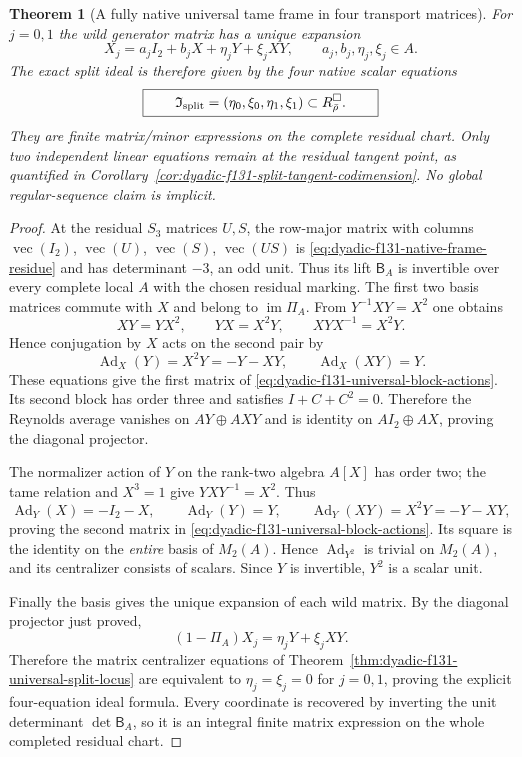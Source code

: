 \documentclass[11pt]{article}
\newtheorem{theorem}{Theorem}[section]
\theoremstyle{definition}
\begin{document}
\begin{theorem}[A fully native universal tame frame in four transport matrices]
For $j=0,1$ the wild
generator matrix has
a unique expansion
\begin{equation}\label{eq:dyadic-f131-wild-native-components}
\boxed{
X_j=a_j I_2+b_j X
+\eta_jY+\xi_jXY,
\qquad
a_j,b_j,\eta_j,\xi_j\in A.
}
\end{equation}
The \emph{exact} split
ideal is therefore
given by the four
native scalar
equations
\begin{equation}\label{eq:dyadic-f131-four-scalar-split-ideal}
\boxed{\qquad
\mathfrak I_{\rm split}
=(\eta_0,\xi_0,\eta_1,\xi_1)
\subset R_{\bar\rho}^{\square}.
\qquad}
\end{equation}
They are finite
matrix/minor
expressions on
the complete
residual chart.
Only two independent
linear equations
remain at the
residual tangent
point, as quantified
in
Corollary~\ref{cor:dyadic-f131-split-tangent-codimension}.
No global regular-sequence
claim is implicit.
\end{theorem}

\begin{proof}
At the residual
$S_3$ matrices
$U,S$, the
row-major matrix
with columns
$\operatorname{vec}(I_2)$,
$\operatorname{vec}(U)$,
$\operatorname{vec}(S)$,
$\operatorname{vec}(US)$
is
\eqref{eq:dyadic-f131-native-frame-residue}
and has determinant
$-3$, an odd unit.
Thus its lift
$\mathsf B_A$
is invertible
over every complete
local $A$ with
the chosen residual
marking.
The first two
basis matrices
commute with
$X$ and belong
to $\operatorname{im}\Pi_A$.
From $Y^{-1}XY=X^2$
one obtains
\[
XY=YX^2,\qquad
YX=X^2Y,\qquad
XYX^{-1}=X^2Y.
\]
Hence conjugation
by $X$ acts on the
second pair by
\[
\operatorname{Ad}_X(Y)
=X^2Y=-Y-XY,\qquad
\operatorname{Ad}_X(XY)=Y.
\]
These equations
give the first
matrix of
\eqref{eq:dyadic-f131-universal-block-actions}.
Its second block
has order three
and satisfies
$I+C+C^2=0$.
Therefore the
Reynolds average
vanishes on
$AY\oplus AXY$
and is identity
on $AI_2\oplus AX$,
proving the
diagonal projector.

The normalizer
action of $Y$ on
the rank-two
algebra $A[X]$
has order two;
the tame relation
and $X^3=1$
give
$YXY^{-1}=X^2$.
Thus
\[
\operatorname{Ad}_Y(X)
=-I_2-X,\qquad
\operatorname{Ad}_Y(Y)=Y,\qquad
\operatorname{Ad}_Y(XY)
=X^2Y=-Y-XY,
\]
proving the
second matrix in
\eqref{eq:dyadic-f131-universal-block-actions}.
Its square is the
identity on the
\emph{entire}
basis of $M_2(A)$.
Hence
$\operatorname{Ad}_{Y^2}$
is trivial on
$M_2(A)$, and
its centralizer
consists of scalars.
Since $Y$ is
invertible,
$Y^2$ is a
scalar unit.

Finally the
basis gives
the unique
expansion of
each wild matrix.
By the diagonal
projector just proved,
\[
(1-\Pi_A)X_j
=\eta_jY+\xi_jXY.
\]
Therefore the
matrix centralizer
equations of
Theorem~\ref{thm:dyadic-f131-universal-split-locus}
are equivalent
to $\eta_j=\xi_j=0$
for $j=0,1$,
proving the
explicit four-equation
ideal formula.
Every coordinate
is recovered by
inverting the
unit determinant
$\det\mathsf B_A$,
so it is an
integral finite
matrix expression
on the whole
completed residual
chart.
\end{proof}
\end{document}
